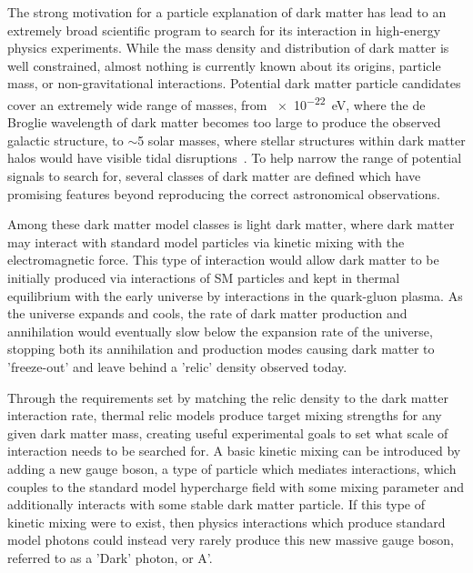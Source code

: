 The strong motivation for a particle explanation of dark matter has lead to an extremely broad scientific program to search for its interaction in high-energy physics experiments. 
While the mass density and distribution of dark matter is well constrained, almost nothing is currently known about its origins, particle mass, or non-gravitational interactions.
Potential dark matter particle candidates cover an extremely wide range of masses, from \SI{e-22}{\eV}, where the de Broglie wavelength of dark matter becomes too large to produce the observed galactic structure, to $\sim$5 solar masses, where stellar structures within dark matter halos would have visible tidal disruptions~\cite{rodriguez_2014}.
To help narrow the range of potential signals to search for, several classes of dark matter are defined which have promising features beyond reproducing the correct astronomical observations. 

Among these dark matter model classes is light dark matter, where dark matter may interact with standard model particles via kinetic mixing with the electromagnetic force. 
This type of interaction would allow dark matter to be initially produced via interactions of SM particles and kept in thermal equilibrium with the early universe by interactions in the quark-gluon plasma.
As the universe expands and cools, the rate of dark matter production and annihilation would eventually slow below the expansion rate of the universe, stopping both its annihilation and production modes causing dark matter to 'freeze-out' and leave behind a 'relic' density observed today.

Through the requirements set by matching the relic density to the dark matter interaction rate, thermal relic models produce target mixing strengths for any given dark matter mass, creating useful experimental goals to set what scale of interaction needs to be searched for.
A basic kinetic mixing can be introduced by adding a new gauge boson, a type of particle which mediates interactions, which couples to the standard model hypercharge field with some mixing parameter and additionally interacts with some stable dark matter particle.
If this type of kinetic mixing were to exist, then physics interactions which produce standard model photons could instead very rarely produce this new massive gauge boson, referred to as a 'Dark' photon, or A'. 


